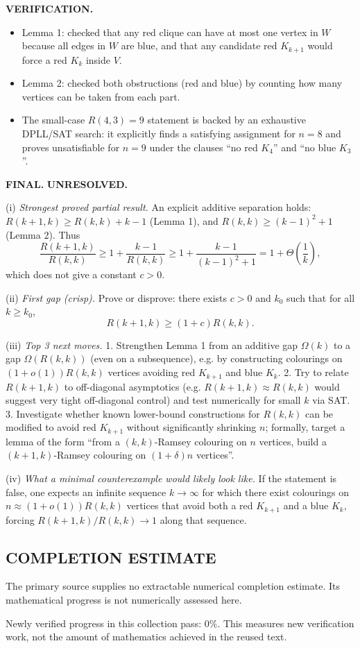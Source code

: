 \textbf{VERIFICATION.}
\begin{itemize}
\item Lemma 1: checked that any red clique can have at most one vertex in $W$ because all edges in $W$ are blue, and that any candidate red $K_{k+1}$ would force a red $K_k$ inside $V$.
\item Lemma 2: checked both obstructions (red and blue) by counting how many vertices can be taken from each part.
\item The small-case $R(4,3)=9$ statement is backed by an exhaustive DPLL/SAT search: it explicitly finds a satisfying assignment for $n=8$ and proves unsatisfiable for $n=9$ under the clauses ``no red $K_4$'' and ``no blue $K_3$''.
\end{itemize}

\textbf{FINAL.} \textbf{UNRESOLVED.}

(i) \emph{Strongest proved partial result.} An explicit additive separation holds: $R(k+1,k)\ge R(k,k)+k-1$ (Lemma 1), and $R(k,k)\ge (k-1)^2+1$ (Lemma 2).
Thus
\[
\frac{R(k+1,k)}{R(k,k)} \ge 1 + \frac{k-1}{R(k,k)} \ge 1 + \frac{k-1}{(k-1)^2+1} = 1 + \Theta\!\left(\frac{1}{k}\right),
\]
which does not give a constant $c>0$.

(ii) \emph{First gap (crisp).} Prove or disprove: there exists $c>0$ and $k_0$ such that for all $k\ge k_0$,
\[R(k+1,k)\ge (1+c)R(k,k).\]

(iii) \emph{Top 3 next moves.}
1. Strengthen Lemma 1 from an additive gap $\Omega(k)$ to a gap $\Omega(R(k,k))$ (even on a subsequence), e.g. by constructing colourings on $(1+o(1))R(k,k)$ vertices avoiding red $K_{k+1}$ and blue $K_k$.
2. Try to relate $R(k+1,k)$ to off-diagonal asymptotics (e.g. $R(k+1,k)\approx R(k,k)$ would suggest very tight off-diagonal control) and test numerically for small $k$ via SAT.
3. Investigate whether known lower-bound constructions for $R(k,k)$ can be modified to avoid red $K_{k+1}$ without significantly shrinking $n$; formally, target a lemma of the form ``from a $(k,k)$-Ramsey colouring on $n$ vertices, build a $(k+1,k)$-Ramsey colouring on $(1+\delta)n$ vertices''.

(iv) \emph{What a minimal counterexample would likely look like.} If the statement is false, one expects an infinite sequence $k\to\infty$ for which there exist colourings on $n\approx (1+o(1))R(k,k)$ vertices that avoid both a red $K_{k+1}$ and a blue $K_k$, forcing $R(k+1,k)/R(k,k)\to 1$ along that sequence.




\subsection*{COMPLETION ESTIMATE}
The primary source supplies no extractable numerical completion estimate. Its mathematical progress is not numerically assessed here.

Newly verified progress in this collection pass: $0\%$. This measures new verification work, not the amount of mathematics achieved in the reused text.
